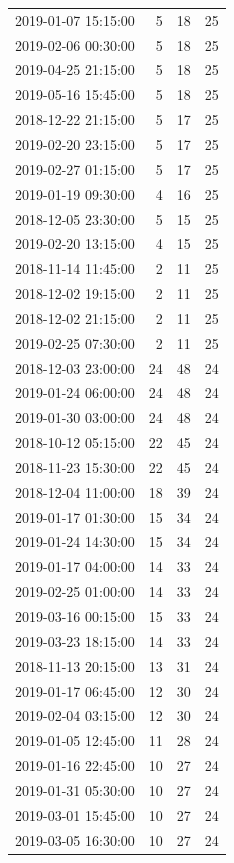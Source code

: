 \begin{tabular}{lrrr}
2019-01-07 15:15:00 & 5 & 18 & 25 \\
2019-02-06 00:30:00 & 5 & 18 & 25 \\
2019-04-25 21:15:00 & 5 & 18 & 25 \\
2019-05-16 15:45:00 & 5 & 18 & 25 \\
2018-12-22 21:15:00 & 5 & 17 & 25 \\
2019-02-20 23:15:00 & 5 & 17 & 25 \\
2019-02-27 01:15:00 & 5 & 17 & 25 \\
2019-01-19 09:30:00 & 4 & 16 & 25 \\
2018-12-05 23:30:00 & 5 & 15 & 25 \\
2019-02-20 13:15:00 & 4 & 15 & 25 \\
2018-11-14 11:45:00 & 2 & 11 & 25 \\
2018-12-02 19:15:00 & 2 & 11 & 25 \\
2018-12-02 21:15:00 & 2 & 11 & 25 \\
2019-02-25 07:30:00 & 2 & 11 & 25 \\
2018-12-03 23:00:00 & 24 & 48 & 24 \\
2019-01-24 06:00:00 & 24 & 48 & 24 \\
2019-01-30 03:00:00 & 24 & 48 & 24 \\
2018-10-12 05:15:00 & 22 & 45 & 24 \\
2018-11-23 15:30:00 & 22 & 45 & 24 \\
2018-12-04 11:00:00 & 18 & 39 & 24 \\
2019-01-17 01:30:00 & 15 & 34 & 24 \\
2019-01-24 14:30:00 & 15 & 34 & 24 \\
2019-01-17 04:00:00 & 14 & 33 & 24 \\
2019-02-25 01:00:00 & 14 & 33 & 24 \\
2019-03-16 00:15:00 & 15 & 33 & 24 \\
2019-03-23 18:15:00 & 14 & 33 & 24 \\
2018-11-13 20:15:00 & 13 & 31 & 24 \\
2019-01-17 06:45:00 & 12 & 30 & 24 \\
2019-02-04 03:15:00 & 12 & 30 & 24 \\
2019-01-05 12:45:00 & 11 & 28 & 24 \\
2019-01-16 22:45:00 & 10 & 27 & 24 \\
2019-01-31 05:30:00 & 10 & 27 & 24 \\
2019-03-01 15:45:00 & 10 & 27 & 24 \\
2019-03-05 16:30:00 & 10 & 27 & 24 \\

\end{tabular}
